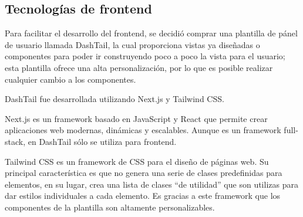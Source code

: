 \subsection{Tecnologías de frontend}
Para facilitar el desarrollo del frontend, se decidió comprar una plantilla de pánel de usuario llamada DashTail, la cual proporciona vistas ya diseñadas o componentes para poder ir construyendo poco a poco la vista para el usuario; esta plantilla ofrece una alta personalización, por lo que es posible realizar cualquier cambio a los componentes.

DashTail fue desarrollada utilizando Next.js y Tailwind CSS. 

Next.js es un framework basado en JavaScript y React que permite crear aplicaciones web modernas, dinámicas y escalables. Aunque es un framework full-stack, en DashTail sólo se utiliza para frontend.

Tailwind CSS es un framework de CSS para el diseño de páginas web. Su principal característica es que no genera una serie de clases predefinidas para elementos, en su lugar, crea una lista de clases ``de utilidad'' que son utilizas para dar estilos individuales a cada elemento. Es gracias a este framework que los componentes de la plantilla son altamente personalizables.